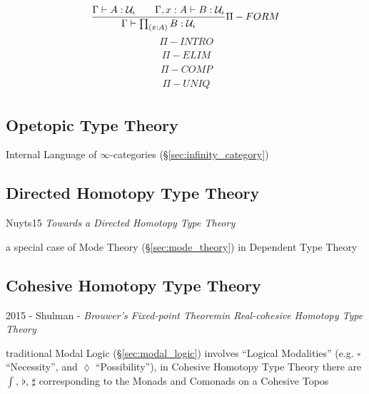 {\[
  {
    \frac
    {\Gamma \vdash A : \mathcal{U}_i \;\;\;\;\;\;\;
    \Gamma,x:A \vdash B : \mathcal{U}_i}
    {\Gamma \vdash \prod_{(x:A)} B : \mathcal{U}_i}
  } \Pi-FORM
\]\[
  {
    \frac
    {}
    {}
  } \Pi-INTRO
\]\[
  {
    \frac
    {}
    {}
  } \Pi-ELIM
\]\[
  {
    \frac
    {}
    {}
  } \Pi-COMP
\]\[
  {
    \frac
    {}
    {}
  } \Pi-UNIQ
\]



\subsection{Opetopic Type Theory}\label{sec:opetopic_typetheory}

Internal Language of $\infty$-categories
(\S\ref{sec:infinity_category})



\subsection{Directed Homotopy Type Theory}\label{sec:directed_hott}

Nuyts15 \emph{Towards a Directed Homotopy Type Theory}

a special case of Mode Theory (\S\ref{sec:mode_theory}) in Dependent
Type Theory



\subsection{Cohesive Homotopy Type Theory}\label{sec:cohesive_hott}

2015 - Shulman - \emph{Brouwer's Fixed-point Theoremin Real-cohesive Homotopy
  Type Theory}

traditional Modal Logic (\S\ref{sec:modal_logic}) involves ``Logical
Modalities'' (e.g. $\square$ ``Necessity'', and $\lozenge$ ``Possibility''), in
Cohesive Homotopy Type Theory there are $\int$, $\flat$, $\sharp$ corresponding
to the Monads and Comonads on a Cohesive Topos

\asterism

}
